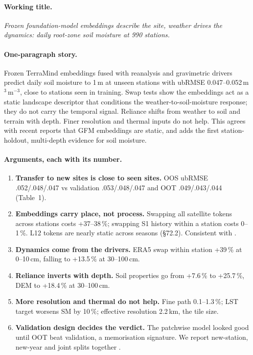 \documentclass[11pt,a4paper]{article}
\begin{document}
\paragraph{Working title.} \emph{Frozen foundation-model embeddings describe the site, weather
drives the dynamics: daily root-zone soil moisture at 990 stations.}

\paragraph{One-paragraph story.} Frozen TerraMind embeddings fused with reanalysis and
gravimetric drivers predict daily soil moisture to 1\,m at unseen stations with ubRMSE
0.047--0.052\,m$^3$\,m$^{-3}$, close to stations seen in training. Swap tests show the embeddings act
as a static landscape descriptor that conditions the weather-to-soil-moisture response; they do not
carry the temporal signal. Reliance shifts from weather to soil and terrain with depth. Finer
resolution and thermal inputs do not help. This agrees with recent reports that GFM embeddings are
static, and adds the first station-holdout, multi-depth evidence for soil moisture.

\paragraph{Arguments, each with its number.}
\begin{enumerate}[label=A\arabic*.]
\item \textbf{Transfer to new sites is close to seen sites.} OOS ubRMSE .052/.048/.047 vs
  validation .053/.048/.047 and OOT .049/.043/.044 (Table~1).
\item \textbf{Embeddings carry place, not process.} Swapping all satellite tokens across stations
  costs +37--38\,\%; swapping S1 history within a station costs 0--1\,\%. L12 tokens are nearly
  static across seasons (\S72.2). Consistent with \citet{rahman2026aef,yu2026ecohydro}.
\item \textbf{Dynamics come from the drivers.} ERA5 swap within station +39\,\% at 0--10\,cm,
  falling to +13.5\,\% at 30--100\,cm.
\item \textbf{Reliance inverts with depth.} Soil properties go from +7.6\,\% to +25.7\,\%,
  DEM to +18.4\,\% at 30--100\,cm.
\item \textbf{More resolution and thermal do not help.} Fine path 0.1--1.3\,\%; LST target
  worsens SM by 10\,\%; effective resolution 2.2\,km, the tile size.
\item \textbf{Validation design decides the verdict.} The patchwise model looked good until OOT
  beat validation, a memorisation signature. We report new-station, new-year and joint splits
  together \citep{ploton2020spatial,meyer2022maps}.
\end{enumerate}
\end{document}
